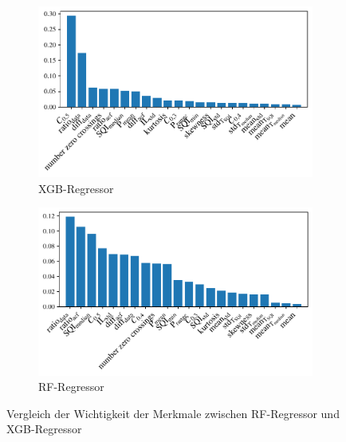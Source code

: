  \begin{figure}[h]
 	\centering
		\begin{subfigure}{.49\textwidth}
			\centering
 			\includegraphics[width=\textwidth]{pic/xgb-regr-final-importances.pdf}
 			\caption{\ac{XGB}-Regressor}
 		\end{subfigure}
    	\begin{subfigure}{.49\textwidth}
    		\centering
 			\includegraphics[width=\textwidth]{pic/rf-regr-final-importances.pdf}
 			\caption{\ac{RF}-Regressor}
 		\end{subfigure}
 	\caption{Vergleich der Wichtigkeit der Merkmale zwischen \ac{RF}-Regressor und \ac{XGB}-Regressor}
 	\label{fig:importances-comparison-rf-xgb-regr}
 \end{figure}
 

